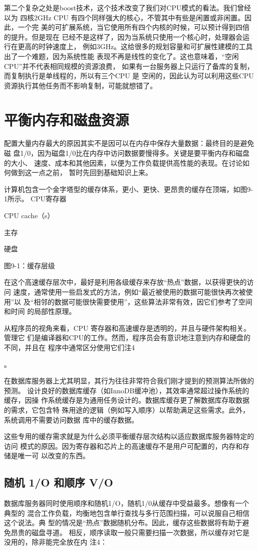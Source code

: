 第二个复杂之处是boost技术，这个技术改变了我们对CPU模式的看法。我们曾经以为
四核2GHz CPU 有四个同样强大的核心，不管其中有些是闲置或非闲置。因此，一个完
美的可扩展系统，当它使用所有四个内核的时候，可以预计得到四倍的提升。但是现在
已经不是这样了，因为当系统只使用一个核心时，处理器会运行在更高的时钟速度上，
例如3GHz。这给很多的规划容量和可扩展性建模的工具出了一个难题，因为系统性能
表现不再是线性的变化了。这也意味着，“空闲CPU”并不代表相同规模的资源浪费，
如果有一台服务器上只运行了备库的复制，而复制执行是单线程的，所以有三个CPU 是
空闲的，因此认为可以利用这些CPU资源执行其他任务而不影响复制，可能就想错了。
\section{平衡内存和磁盘资源}
配置大量内存最大的原因其实不是因可以在内存中保存大量数据：最终目的是避免磁
盘1/0，因为磁盘1/0比在内存中访问数据要慢得多。关键是要平衡内存和磁盘的大小、
速度、成本和其他因素，以便为工作负载提供高性能的表现。在讨论如何做到这一点之前，
暂时先回到基础知识上来。

计算机包含一个金字塔型的缓存体系，更小、更快、更昂贵的缓存在顶端，如图9-1所示。
CPU寄存器

CPU cache（s）

主存

硬盘

图9-1：缓存层级

在这个高速缓存层次中，最好是利用各级缓存来存放“热点”数据，以获得更快的访问
速度，通常使用一些启发式的方法，例如“最近被使用的数据可能很快再次被使用”以
及“相邻的数据可能很快需要使用”，这些算法非常有效，因它们参考了空间和时间
的局部性原理。

从程序员的视角来看，CPU 寄存器和高速缓存是透明的，并且与硬件架构相关。管理它
们是编译器和CPU的工作。然而，程序员会有意识地注意到内存和硬盘的不同，并且在
程序中通常区分使用它们注4

。

在数据库服务器上尤其明显，其行为往往非常符合我们刚才提到的预测算法所做的预测。
设计良好的数据库缓存（如InnoDB缓冲池），其效率通常超过操作系统的缓存，因操
作系统缓存是为通用任务设计的。数据库缓存更了解数据库存取数据的需求，它包含特
殊用途的逻辑（例如写入顺序）以帮助满足这些需求。此外，系统调用不需要访问数据
库中的缓存数据。

这些专用的缓存需求就是为什么必须平衡缓存层次结构以适应数据库服务器特定的访问
模式的原因。因为寄存器和芯片上的高速缓存不是用户可配置的，内存和存储是唯一可
以改变的东西。

\subsection{随机 1/O 和顺序 V/O}
数据库服务器同时使用顺序和随机1/O，随机1/0从缓存中受益最多。想像有一个典型的
混合工作负载，均衡地包含单行查找与多行范围扫描，可以说服自己相信这个说法。典
型的情况是“热点”数据随机分布。因此，缓存这些数据将有助于避免昂贵的磁盘寻道。
相反，顺序读取一般只需要扫描一次数据，所以缓存对它是没用的，除非能完全放在内
注4：

